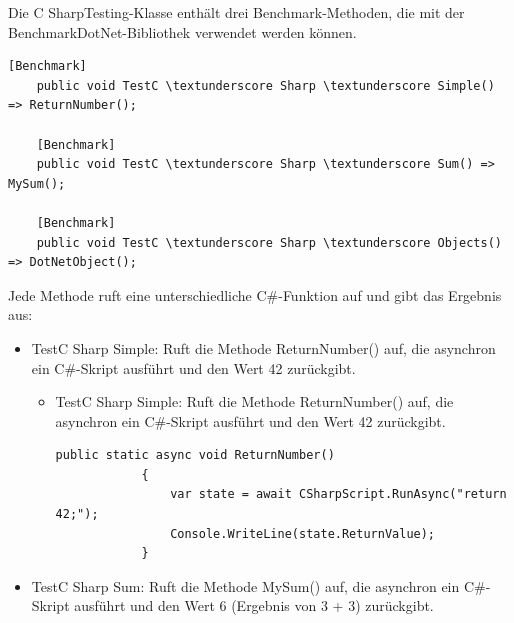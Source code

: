 Die C \textunderscore SharpTesting-Klasse enthält drei Benchmark-Methoden, die mit der BenchmarkDotNet-Bibliothek verwendet werden können. 
\begin{lstlisting}[language={[Sharp]C}, caption=C\#Scripting Benchmark, label=lst:imp:cscBench]
    [Benchmark]
    public void TestC \textunderscore Sharp \textunderscore Simple() => ReturnNumber();

    [Benchmark]
    public void TestC \textunderscore Sharp \textunderscore Sum() => MySum();

    [Benchmark]
    public void TestC \textunderscore Sharp \textunderscore Objects() => DotNetObject();
\end{lstlisting}
 \newpage
Jede Methode ruft eine unterschiedliche C\#-Funktion auf und gibt das Ergebnis aus:
\begin{itemize}
    \item TestC \textunderscore Sharp \textunderscore Simple: Ruft die Methode ReturnNumber() auf, die asynchron ein C\#-Skript ausführt und den Wert 42 zurückgibt.
    \begin{itemize}
        \item TestC \textunderscore Sharp \textunderscore Simple: Ruft die Methode ReturnNumber() auf, die asynchron ein C\#-Skript ausführt und den Wert 42 zurückgibt.
        \begin{lstlisting}[language={[Sharp]C}, caption=C\#Scripting ReturnNumber, label=lst:imp:cscnumber]
            public static async void ReturnNumber()
            {
                var state = await CSharpScript.RunAsync("return 42;");
                Console.WriteLine(state.ReturnValue);
            }
        \end{lstlisting}
    \end{itemize}
    \item TestC \textunderscore Sharp \textunderscore Sum: Ruft die Methode MySum() auf, die asynchron ein C\#-Skript ausführt und den Wert 6 (Ergebnis von 3 + 3) zurückgibt.


\end{itemize}
